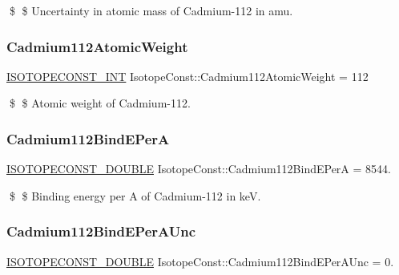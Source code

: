 \$ \$ Uncertainty in atomic mass of Cadmium-\/112 in amu. \mbox{\label{group___isotope_const-_cadmium-_cd112_gaef120b495350e4a0fe41f498f935cd92}} 
\subsubsection{\texorpdfstring{Cadmium112\+Atomic\+Weight}{Cadmium112AtomicWeight}}
{\footnotesize\ttfamily \mbox{\hyperlink{group___isotope_const-_macros_ga5f18360b3e99483a35c32d789e62621c}{I\+S\+O\+T\+O\+P\+E\+C\+O\+N\+S\+T\+\_\+\+I\+NT}} Isotope\+Const\+::\+Cadmium112\+Atomic\+Weight = 112}

\$ \$ Atomic weight of Cadmium-\/112. \mbox{\label{group___isotope_const-_cadmium-_cd112_gabc3a330879126238bcd4897e162f870c}} 
\subsubsection{\texorpdfstring{Cadmium112\+Bind\+E\+PerA}{Cadmium112BindEPerA}}
{\footnotesize\ttfamily \mbox{\hyperlink{group___isotope_const-_macros_ga8f45a7272ce02c0b4c65c44636ed719a}{I\+S\+O\+T\+O\+P\+E\+C\+O\+N\+S\+T\+\_\+\+D\+O\+U\+B\+LE}} Isotope\+Const\+::\+Cadmium112\+Bind\+E\+PerA = 8544.}

\$ \$ Binding energy per A of Cadmium-\/112 in keV. \mbox{\label{group___isotope_const-_cadmium-_cd112_gac9543ee3ddc8f2ec165741b55e0d5426}} 
\subsubsection{\texorpdfstring{Cadmium112\+Bind\+E\+Per\+A\+Unc}{Cadmium112BindEPerAUnc}}
{\footnotesize\ttfamily \mbox{\hyperlink{group___isotope_const-_macros_ga8f45a7272ce02c0b4c65c44636ed719a}{I\+S\+O\+T\+O\+P\+E\+C\+O\+N\+S\+T\+\_\+\+D\+O\+U\+B\+LE}} Isotope\+Const\+::\+Cadmium112\+Bind\+E\+Per\+A\+Unc = 0.}

